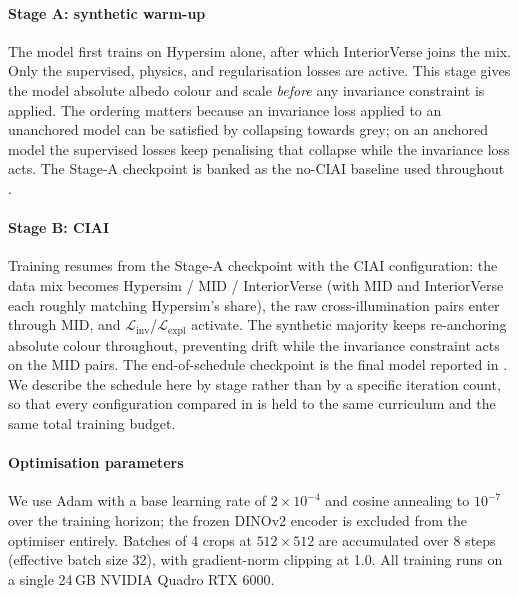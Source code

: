 \paragraph{Stage A: synthetic warm-up}
The model first trains on Hypersim alone, after which InteriorVerse joins the
mix.
Only the supervised, physics, and regularisation losses are active.
This stage gives the model absolute albedo colour and scale \emph{before} any
invariance constraint is applied. The ordering matters because an invariance loss
applied to an unanchored model can be satisfied by collapsing towards grey; on an
anchored model the supervised losses keep penalising that collapse while the
invariance loss acts.
The Stage-A checkpoint is banked as the no-CIAI baseline used throughout
.

\paragraph{Stage B: CIAI}
Training resumes from the Stage-A checkpoint with the CIAI configuration: the
data mix becomes Hypersim / MID / InteriorVerse (with MID and InteriorVerse
each roughly matching Hypersim's share), the raw cross-illumination pairs enter
through MID, and $\mathcal{L}_{\text{inv}}$/$\mathcal{L}_{\text{expl}}$
activate.
The synthetic majority keeps re-anchoring absolute colour throughout,
preventing drift while the invariance constraint acts on the MID pairs.
The end-of-schedule checkpoint is the final model reported in
.
We describe the schedule here by stage rather than by a specific iteration
count, so that every configuration compared in  is
held to the same curriculum and the same total training budget.

\paragraph{Optimisation parameters}
We use Adam with a base learning rate of $2 \times 10^{-4}$ and cosine annealing
to $10^{-7}$ over the training horizon; the frozen DINOv2 encoder is excluded
from the optimiser entirely.
Batches of 4 crops at $512 \times 512$ are accumulated over 8 steps (effective
batch size 32), with gradient-norm clipping at 1.0.
All training runs on a single 24\,GB NVIDIA Quadro RTX 6000.

